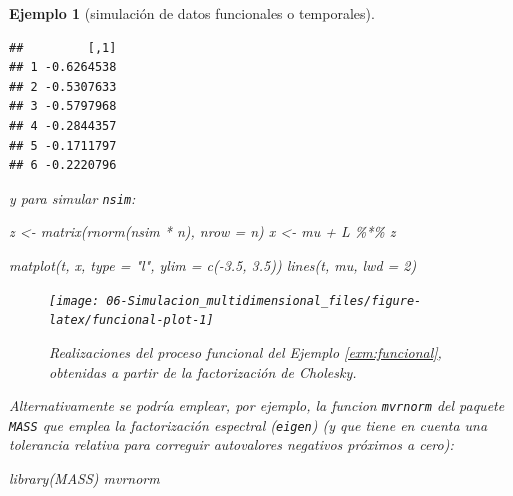 \documentclass[
]{book}
\newenvironment{Shaded}{\begin{snugshade}}{\end{snugshade}}
\newcommand{\AttributeTok}[1]{\textcolor[rgb]{0.77,0.63,0.00}{#1}}
\newcommand{\DecValTok}[1]{\textcolor[rgb]{0.00,0.00,0.81}{#1}}
\newcommand{\FloatTok}[1]{\textcolor[rgb]{0.00,0.00,0.81}{#1}}
\newcommand{\FunctionTok}[1]{\textcolor[rgb]{0.00,0.00,0.00}{#1}}
\newcommand{\NormalTok}[1]{#1}
\newcommand{\OtherTok}[1]{\textcolor[rgb]{0.56,0.35,0.01}{#1}}
\newcommand{\SpecialCharTok}[1]{\textcolor[rgb]{0.00,0.00,0.00}{#1}}
\newcommand{\StringTok}[1]{\textcolor[rgb]{0.31,0.60,0.02}{#1}}
\theoremstyle{break}
\newtheorem{example}{Ejemplo}[chapter]
\theoremstyle{nonumberplain}
\begin{document}
\begin{example}[simulación de datos funcionales o temporales]
\begin{verbatim}
##         [,1]
## 1 -0.6264538
## 2 -0.5307633
## 3 -0.5797968
## 4 -0.2844357
## 5 -0.1711797
## 6 -0.2220796
\end{verbatim}

y para simular \texttt{nsim}:



\begin{Shaded}
\begin{Highlighting}[]
\NormalTok{z }\OtherTok{\textless{}{-}} \FunctionTok{matrix}\NormalTok{(}\FunctionTok{rnorm}\NormalTok{(nsim }\SpecialCharTok{*}\NormalTok{ n), }\AttributeTok{nrow =}\NormalTok{ n)}
\NormalTok{x }\OtherTok{\textless{}{-}}\NormalTok{ mu }\SpecialCharTok{+}\NormalTok{ L }\SpecialCharTok{\%*\%}\NormalTok{ z}

\FunctionTok{matplot}\NormalTok{(t, x, }\AttributeTok{type =} \StringTok{"l"}\NormalTok{, }\AttributeTok{ylim =} \FunctionTok{c}\NormalTok{(}\SpecialCharTok{{-}}\FloatTok{3.5}\NormalTok{, }\FloatTok{3.5}\NormalTok{))}
\FunctionTok{lines}\NormalTok{(t, mu, }\AttributeTok{lwd =} \DecValTok{2}\NormalTok{)}
\end{Highlighting}
\end{Shaded}

\begin{figure}[!htb]

{\centering \texttt{[image: 06-Simulacion\_multidimensional\_files/figure-latex/funcional-plot-1]} 

}

\caption{Realizaciones del proceso funcional del Ejemplo \ref{exm:funcional}, obtenidas a partir de la factorización de Cholesky.}\label{fig:funcional-plot}
\end{figure}

Alternativamente se podría emplear, por ejemplo, la funcion \texttt{mvrnorm}
del paquete \texttt{MASS} que emplea la factorización espectral (\texttt{eigen}) (y que tiene en cuenta una tolerancia relativa para correguir autovalores negativos próximos a cero):



\begin{Shaded}
\begin{Highlighting}[]
\FunctionTok{library}\NormalTok{(MASS)}
\NormalTok{mvrnorm}
\end{Highlighting}
\end{Shaded}


\end{example}
\end{document}

